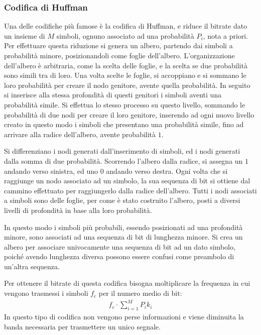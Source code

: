 \documentclass{article}
\numberwithin{equation}{subsection}
\begin{document}
\subsubsection{Codifica di Huffman}

Una delle codifiche più famose è la codifica di Huffman, e riduce il bitrate dato un insieme di $M$ simboli, ognuno associato ad una probabilità $P_i$, nota a priori. 
Per effettuare questa riduzione si genera un albero, partendo dai simboli a probabilità minore, posizionandoli 
come foglie dell'albero. L'organizzazione dell'albero è arbitraria, come la scelta delle foglie, e la scelta se due probabilità sono simili tra di loro. 
Una volta scelte le foglie, si accoppiano e si sommano le loro probabilità per creare il nodo genitore, avente quella probabilità. In seguito si inserisce alla stessa profondità di questi genitori 
i simboli aventi una probabilità simile. Si effettua lo stesso processo su questo livello, sommando le probabilità di due nodi per creare il loro genitore, inserendo 
ad ogni nuovo livello creato in questo modo i simboli che presentano una probabilità simile, fino ad arrivare alla radice dell'albero, avente probabilità $1$. 

Si differenziano i nodi generati dall'inserimento di simboli, ed i nodi generati dalla somma di due probabilità. Scorrendo l'albero dalla radice, si assegna un $1$ andando 
verso sinistra, ed uno $0$ andando verso destra. Ogni volta che si raggiunge un nodo associato ad un simbolo, la sua sequenza di bit si ottiene dal cammino 
effettuato per raggiungerlo dalla radice dell'albero. 
Tutti i nodi associati a simboli sono delle foglie, per come è stato costruito l'albero, posti a diversi livelli di profondità in base alla loro probabilità. 

In questo modo i simboli più probabili, essendo posizionati ad una profondità minore, sono associati ad una sequenza di bit di lunghezza minore. Si crea un albero per associare univocamente una sequenza di bit ad un 
dato simbolo, poiché avendo lunghezza diversa possono essere confusi come preambolo di un'altra sequenza. 


Per ottenere il bitrate di questa codifica bisogna moltiplicare la frequenza in cui vengono trasmessi i simboli $f_c$ per il numero medio di bit:
\begin{gather*}
    f_c\cdot\displaystyle\sum_{i=1}^MP_ik_i
\end{gather*}
In questo tipo di codifica non vengono perse informazioni e viene diminuita la banda necessaria per trasmettere un unico segnale. 
\end{document}
